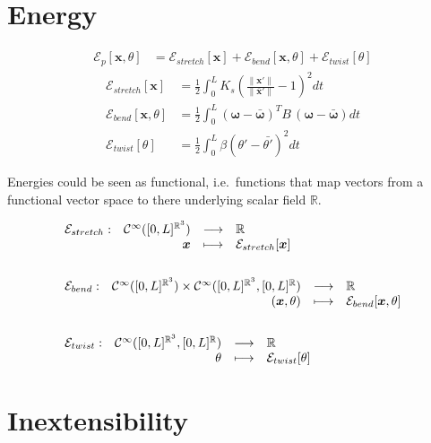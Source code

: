 \section{Energy}

\begin{align}
\mathcal{E}_p[\boldsymbol{x},\theta] & = \mathcal{E}_{stretch}[\boldsymbol{x}] + \mathcal{E}_{bend}[\boldsymbol{x},\theta] + \mathcal{E}_{twist}[\theta]
\end{align}
\begin{align}
\mathcal{E}_{stretch}[\boldsymbol{x}] & = \tfrac{1}{2} \int_{0}^{L} K_s(\tfrac{\|\boldsymbol{x}'\|}{\|\bar{\boldsymbol{x}}'\|}-1)^2dt \\
\mathcal{E}_{bend}[\boldsymbol{x},\theta] & = \tfrac{1}{2} \int_{0}^{L} (\boldsymbol\omega -\boldsymbol{\bar{\omega}})^T B \, (\boldsymbol\omega -\boldsymbol{\bar{\omega}})dt \\
\mathcal{E}_{twist}[\theta] & = \tfrac{1}{2} \int_{0}^{L} \beta(\theta' -{\bar{\theta'}})^2dt
\end{align}

Energies could be seen as functional, i.e.\ functions that map vectors from a functional vector space to there underlying scalar field $\mathbb{R}$.

\begin{align}
	&\begin{array}{lrcl} \mathcal{E}_{stretch}: & \mathcal{C}^{\infty}([0,L]^{\mathbb{R}^3}) & \longrightarrow & \mathbb{R} \\ & \boldsymbol{x} & \longmapsto & \mathcal{E}_{stretch}[\boldsymbol{x}] \end{array}
	\\ \notag\\
	&\begin{array}{lrcl} \mathcal{E}_{bend}: & \mathcal{C}^{\infty}([0,L]^{\mathbb{R}^3}) \times \mathcal{C}^\infty([0,L]^{\mathbb{R}^3},[0,L]^{\mathbb{R}}) & \longrightarrow & \mathbb{R} \\ & (\boldsymbol{x},\theta) & \longmapsto & \mathcal{E}_{bend}[\boldsymbol{x},\theta] \end{array}
	\\ \notag\\
	&\begin{array}{lrcl} \mathcal{E}_{twist}: & \mathcal{C}^\infty([0,L]^{\mathbb{R}^3},[0,L]^{\mathbb{R}}) & \longrightarrow & \mathbb{R} \\ & \theta & \longmapsto & \mathcal{E}_{twist}[\theta] \end{array}
\end{align}

\section{Inextensibility}





